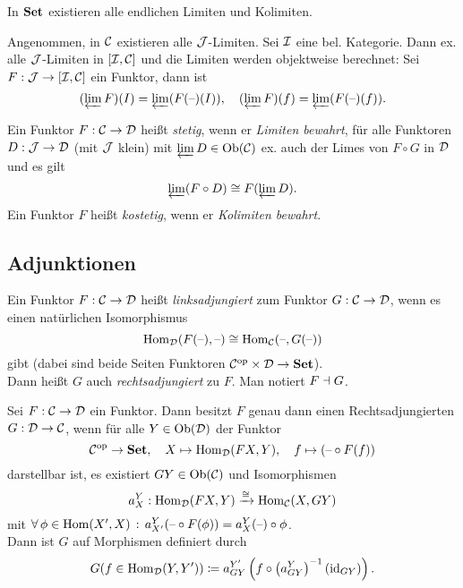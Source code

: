 \documentclass{cheat-sheet}
\begin{document}
\begin{kor}
  In $\mathbf{Set}$ existieren alle endlichen Limiten und Kolimiten.
\end{kor}

\begin{bem}
  Angenommen, in $\mathcal{C}$ existieren alle $\mathcal{J}$-Limiten.
  Sei $\mathcal{I}$ eine bel. Kategorie.
  Dann ex. alle $\mathcal{J}$-Limiten in $[\mathcal{I}, \mathcal{C}]$ und die Limiten werden objektweise berechnet:
  Sei $F : \mathcal{J} \to [\mathcal{I}, \mathcal{C}]$ ein Funktor, dann ist
  \[
    (\varprojlim F)(I) = \varprojlim (F(\text{--})(I)), \quad
    (\varprojlim F)(f) = \varprojlim (F(\text{--})(f)).
  \]
\end{bem}

\begin{defn}
  Ein Funktor $F : \mathcal{C} \to \mathcal{D}$ heißt \emph{stetig}, wenn er \emph{Limiten bewahrt}, \dh{} für alle Funktoren $D : \mathcal{J} \to \mathcal{D}$ (mit $\mathcal{J}$ klein) mit $\varprojlim D \in \operatorname{Ob}(\mathcal{C})$ ex. auch der Limes von $F \circ G$ in $\mathcal{D}$ und es gilt
  \[ \varprojlim (F \circ D) \cong F(\varprojlim D). \]
  Ein Funktor $F$ heißt \emph{kostetig}, wenn er \emph{Kolimiten bewahrt}.
\end{defn}


\subsection{Adjunktionen}

\begin{defn}
  Ein Funktor $F : \mathcal{C} \to \mathcal{D}$ heißt \emph{linksadjungiert} zum Funktor $G : \mathcal{C} \to \mathcal{D}$, wenn es einen natürlichen Isomorphismus
  \[
    \operatorname{Hom}_{\mathcal{D}}(F(\text{--}), \text{--}) \cong \operatorname{Hom}_{\mathcal{C}}(\text{--}, G(\text{--}))
  \]
  gibt (dabei sind beide Seiten Funktoren $\mathcal{C}^{\mathrm{op}} \times \mathcal{D} \to \mathbf{Set}$). \\
  Dann heißt $G$ auch \emph{rechtsadjungiert} zu $F$. Man notiert $F \dashv G$.
\end{defn}

\begin{bem}
  Sei $F : \mathcal{C} \to \mathcal{D}$ ein Funktor.
  Dann besitzt $F$ genau dann einen Rechtsadjungierten $G : \mathcal{D} \to \mathcal{C}$, wenn für alle $Y \in \operatorname{Ob}(\mathcal{D})$ der Funktor
  \[
    \mathcal{C}^{\mathrm{op}} \to \mathbf{Set}, \quad
    X \mapsto \operatorname{Hom}_{\mathcal{D}}(FX, Y), \quad
    f \mapsto (\text{--} \circ F(f))
  \]
  darstellbar ist, \dh{} es existiert $GY \in \operatorname{Ob}(\mathcal{C})$ und Isomorphismen
  \[ a^Y_X : \operatorname{Hom}_{\mathcal{D}}(FX, Y) \xrightarrow{\cong} \operatorname{Hom}_{\mathcal{C}}(X, GY) \]
  mit $\forall \, {\phi \in \operatorname{Hom}(X', X)} \,:\, a^Y_{X'}(\text{--} \circ F(\phi)) = a^Y_X(\text{--}) \circ \phi$. \\
  Dann ist $G$ auf Morphismen definiert durch
  \[ G(f \in \operatorname{Hom}_{\mathcal{D}}(Y, Y')) \coloneqq a^{Y'}_{GY} \left( f \circ \left( a^Y_{GY} \right)^{-1} (\operatorname{id}_{GY}) \right). \]
\end{bem}
\end{document}
